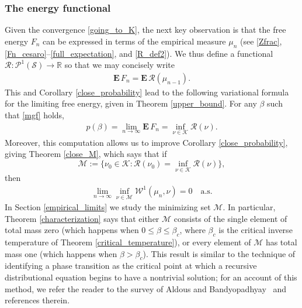 \documentclass[11pt,reqno]{amsart}
\numberwithin{equation}{section}
\theoremstyle{definition}
\begin{document}
\subsubsection{The energy functional}
Given the convergence \eqref{going_to_K}, the next key observation is that the free energy $F_n$ can be expressed in terms of the empirical measure $\mu_n$ (see \eqref{Zfrac}, \eqref{Fn_cesaro}--\eqref{full_expectation}, and \eqref{R_def2}).
We thus define a functional ${\mathcal{R}} : {\mathcal{P}}^1({\mathcal{S}}) \to {\mathbb{R}}$ so that we may concisely write
{\begin{align*} {
{\mathbf{E}}\, F_n = {\mathbf{E}}\, {\mathcal{R}}(\mu_{n-1}).
} \end{align*}}
This and Corollary \ref{close_probability} lead to the following variational formula for the limiting free energy, given in Theorem \ref{upper_bound}. For any $\beta$ such that \eqref{mgf} holds,
{\begin{align*} {
p(\beta) = \lim_{n \to \infty} {\mathbf{E}}\, F_n = \inf_{\nu \in {\mathcal{K}}} {\mathcal{R}}(\nu).
} \end{align*}}
Moreover, this computation allows us to improve Corollary \ref{close_probability}, giving Theorem \ref{close_M}, which says that if 
\[
{\mathcal{M}} := \Big\{\nu_0 \in {\mathcal{K}} : {\mathcal{R}}(\nu_0) = \inf_{\nu \in {\mathcal{K}}} {\mathcal{R}}(\nu)\Big\},
\]
then
{\begin{align*} {
\lim_{n \to \infty} \inf_{\nu \in {\mathcal{M}}} {\mathcal{W}}^1(\mu_n,\nu) = 0 \quad \mathrm{a.s.}
} \end{align*}}
In Section \ref{empirical_limits} we study the minimizing set ${\mathcal{M}}$. In particular, Theorem \ref{characterization} says that either ${\mathcal{M}}$ consists of the single element of total mass zero (which happens when $0\le \beta\le \beta_c$, where $\beta_c$ is the critical inverse temperature of Theorem \ref{critical_temperature}), or every element of ${\mathcal{M}}$ has total mass one (which happens when $\beta>\beta_c$).
This result is similar to the technique of identifying a phase transition as the critical point at which a recursive distributional equation begins to have a nontrivial solution; for an account of this method, we refer the reader to the survey of Aldous and Bandyopadhyay~\cite{aldous-bandyopadhyay05} and references therein.
\end{document}
